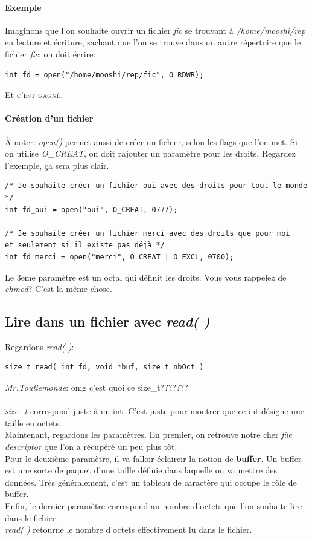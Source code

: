 \documentclass{report}
\begin{document}
\paragraph{Exemple}
Imaginons que l'on souhaite ouvrir un fichier \emph{fic} se trouvant à \emph{/home/mooshi/rep} en lecture et écriture, sachant que l'on se trouve dans un autre répertoire que le fichier \emph{fic}; on doit écrire:
\begin{verbatim}
int fd = open("/home/mooshi/rep/fic", O_RDWR);
\end{verbatim}
Et \textsc{c'est gagné}.

\paragraph{Création d'un fichier} À noter: \emph{open()} permet aussi de créer un fichier, selon les flags que l'on met. Si on utilise \emph{O\_CREAT}, on doit rajouter un paramètre pour les droits. Regardez l'exemple, ça sera plus clair.
\begin{lstlisting}
/* Je souhaite créer un fichier oui avec des droits pour tout le monde */
int fd_oui = open("oui", O_CREAT, 0777);

/* Je souhaite créer un fichier merci avec des droits que pour moi
et seulement si il existe pas déjà */
int fd_merci = open("merci", O_CREAT | O_EXCL, 0700);
\end{lstlisting}
Le 3eme paramètre est un octal qui définit les droits. Vous vous rappelez de \emph{chmod}? C'est la même chose.

\subsection{Lire dans un fichier avec \emph{read( )}}
Regardons \emph{read( )}:
\begin{verbatim}
size_t read( int fd, void *buf, size_t nbOct )
\end{verbatim}
\textit{Mr.Toutlemonde}: omg c'est quoi ce size\_t??????? \\
\\
\emph{size\_t} correspond juste à un int. C'est juste pour montrer que ce int désigne une taille en octets.\\
Maintenant, regardons les paramètres. En premier, on retrouve notre cher \emph{file descriptor} que l'on a récupéré un peu plus tôt.\\
Pour le deuxième paramètre, il va falloir éclaircir la notion de \textbf{buffer}. Un buffer est une sorte de paquet d'une taille définie dans laquelle on va mettre des données. Très généralement, c'est un tableau de caractère qui occupe le rôle de buffer.\\
Enfin, le dernier paramètre correspond au nombre d'octets que l'on souhaite lire dans le fichier.\\
\emph{read( )} retourne le nombre d'octets effectivement lu dans le fichier.
\end{document}
